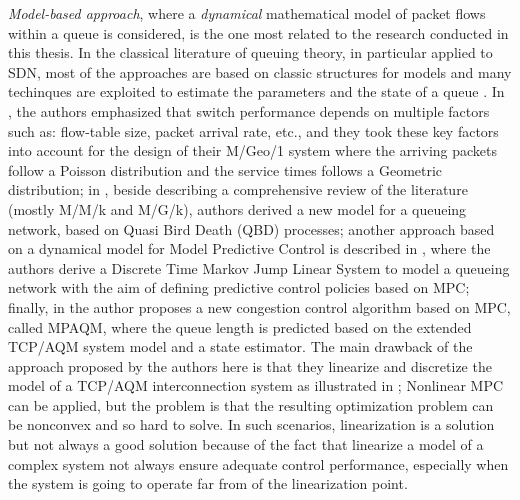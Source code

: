 \textit{Model-based approach}, where a \textit{dynamical} mathematical model of packet flows within a queue is considered, is the one most related to the research conducted in this thesis. In the classical literature of queuing theory, in particular applied to SDN, most of the approaches are based on classic structures for models \cite{MDPSDNSURV} and many techinques are exploited to estimate the parameters and the state of a queue \cite{ParameterStateEst}. In \cite{Sood2016PerformanceAO}, the authors emphasized that switch performance depends on multiple factors such as: flow-table size, packet arrival rate, etc., and they took these key factors into account for the design of their M/Geo/1 system where the arriving packets follow a Poisson distribution and the service times follows a Geometric distribution; in \cite{SINGH201824}, beside describing a comprehensive review of the literature (mostly M/M/k and M/G/k), authors derived a new model for a queueing network, based on Quasi Bird Death (QBD) processes; another approach based on a dynamical model for Model Predictive Control is described in \cite{SchoffMPC}, where the authors derive a Discrete Time Markov Jump Linear System to model a queueing network with the aim of defining predictive control policies based on MPC; finally, in \cite{WANG2012120} the author proposes a new congestion control algorithm based on MPC, called MPAQM, where the queue length is predicted based on the extended TCP/AQM system model and a state estimator. The main drawback of the approach proposed by the authors here is that they linearize and discretize the model of a TCP/AQM interconnection system as illustrated in \cite{TCPSTATESPACE}; Nonlinear MPC can be applied, but the problem is that the resulting optimization problem can be nonconvex and so hard to solve. In such scenarios, linearization is a solution but not always a good solution because of the fact that linearize a model of a complex system not always ensure adequate control performance, especially when the system is going to operate far from of the linearization point.
%  

